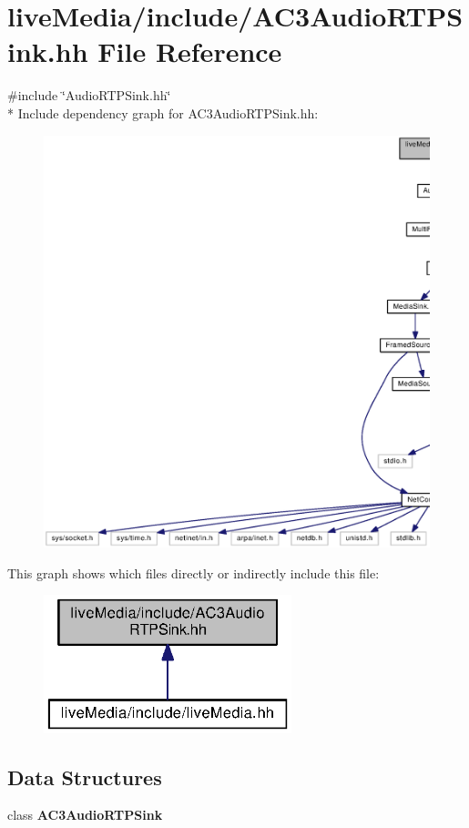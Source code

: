 \section{live\+Media/include/\+A\+C3\+Audio\+R\+T\+P\+Sink.hh File Reference}
\label{AC3AudioRTPSink_8hh}
{\ttfamily \#include \char`\"{}Audio\+R\+T\+P\+Sink.\+hh\char`\"{}}\\*
Include dependency graph for A\+C3\+Audio\+R\+T\+P\+Sink.\+hh\+:
\nopagebreak
\begin{figure}[H]
\begin{center}
\leavevmode
\includegraphics[width=350pt]{AC3AudioRTPSink_8hh__incl}
\end{center}
\end{figure}
This graph shows which files directly or indirectly include this file\+:
\nopagebreak
\begin{figure}[H]
\begin{center}
\leavevmode
\includegraphics[width=204pt]{AC3AudioRTPSink_8hh__dep__incl}
\end{center}
\end{figure}
\subsection*{Data Structures}
\begin{DoxyCompactItemize}
\item 
class {\bf A\+C3\+Audio\+R\+T\+P\+Sink}
\end{DoxyCompactItemize}
